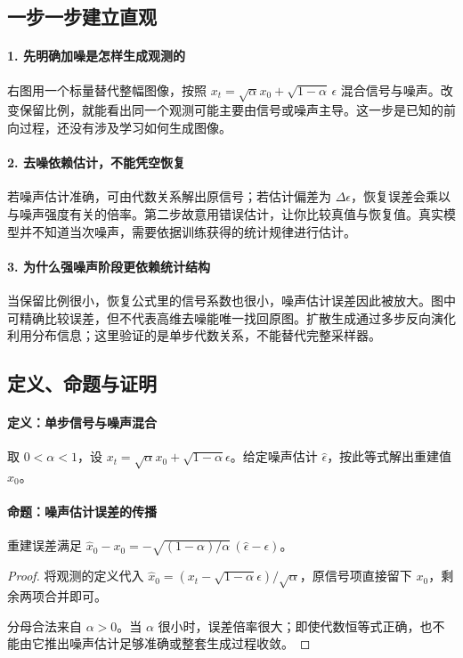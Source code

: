 \subsection*{一步一步建立直观}

\paragraph{1. 先明确加噪是怎样生成观测的}

右图用一个标量替代整幅图像，按照 $x_t=\sqrt{\alpha}x_0+\sqrt{1-\alpha}\,\epsilon$ 混合信号与噪声。改变保留比例，就能看出同一个观测可能主要由信号或噪声主导。这一步是已知的前向过程，还没有涉及学习如何生成图像。



\paragraph{2. 去噪依赖估计，不能凭空恢复}

若噪声估计准确，可由代数关系解出原信号；若估计偏差为 $\Delta\epsilon$，恢复误差会乘以与噪声强度有关的倍率。第二步故意用错误估计，让你比较真值与恢复值。真实模型并不知道当次噪声，需要依据训练获得的统计规律进行估计。



\paragraph{3. 为什么强噪声阶段更依赖统计结构}

当保留比例很小，恢复公式里的信号系数也很小，噪声估计误差因此被放大。图中可精确比较误差，但不代表高维去噪能唯一找回原图。扩散生成通过多步反向演化利用分布信息；这里验证的是单步代数关系，不能替代完整采样器。



\subsection*{定义、命题与证明}

\paragraph{定义：单步信号与噪声混合}

取 $0<\alpha<1$，设 $x_t=\sqrt{\alpha}x_0+\sqrt{1-\alpha}\epsilon$。给定噪声估计 $\widehat\epsilon$，按此等式解出重建值 $\widehat x_0$。

\paragraph{命题：噪声估计误差的传播}

重建误差满足 $\widehat x_0-x_0=-\sqrt{(1-\alpha)/\alpha}\,(\widehat\epsilon-\epsilon)$。

\begin{proof}

将观测的定义代入 $\widehat x_0=(x_t-\sqrt{1-\alpha}\widehat\epsilon)/\sqrt{\alpha}$，原信号项直接留下 $x_0$，剩余两项合并即可。

分母合法来自 $\alpha>0$。当 $\alpha$ 很小时，误差倍率很大；即使代数恒等式正确，也不能由它推出噪声估计足够准确或整套生成过程收敛。

\end{proof}
